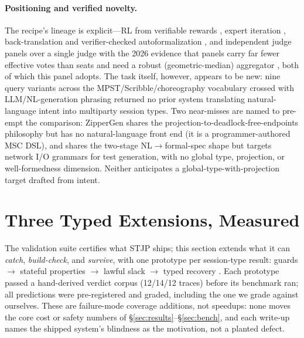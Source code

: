 \documentclass{article}
\newcommand{\stjp}{\textsc{STJP}}
\begin{document}
\paragraph{Positioning and verified novelty.} The recipe's lineage is explicit---RL from verifiable rewards \citep{deepseekmath,dapo,gspo,drgrpo}, expert iteration \citep{star22}, back-translation and verifier-checked autoformalization \citep{sennrich16,autoform}, and independent judge panels over a single judge \citep{poll24} with the 2026 evidence that panels carry far fewer effective votes than seats \citep{kohli26} and need a robust (geometric-median) aggregator \citep{ropoll26}, both of which this panel adopts. The task itself, however, appears to be new: nine query variants across the MPST/Scribble/choreography vocabulary crossed with LLM/NL-generation phrasing returned no prior system translating natural-language intent into multiparty session types. Two near-misses are named to pre-empt the comparison: ZipperGen \citep{bollig26} shares the projection-to-deadlock-free-endpoints philosophy but has no natural-language front end (it is a programmer-authored MSC DSL), and \citet{liu25netproto} shares the two-stage NL$\to$formal-spec shape but targets network I/O grammars for test generation, with no global type, projection, or well-formedness dimension. Neither anticipates a global-type-with-projection target drafted from intent.

\section{Three Typed Extensions, Measured}\label{sec:ext}
The validation suite certifies what \stjp{} ships; this section extends what it can \emph{catch}, \emph{build-check}, and \emph{survive}, with one prototype per session-type result: guards \citep{bocchi10} $\to$ stateful properties \citep{chen12} $\to$ lawful slack \citep{chen17,chen24} $\to$ typed recovery \citep{viering18}. Each prototype passed a hand-derived verdict corpus (12/14/12 traces) before its benchmark ran; all predictions were pre-registered and graded, including the one we grade against ourselves. These are failure-mode coverage additions, not speedups: none moves the core cost or safety numbers of \S\ref{sec:results}--\S\ref{sec:bench}, and each write-up names the shipped system's blindness as the motivation, not a planted defect.
\end{document}
